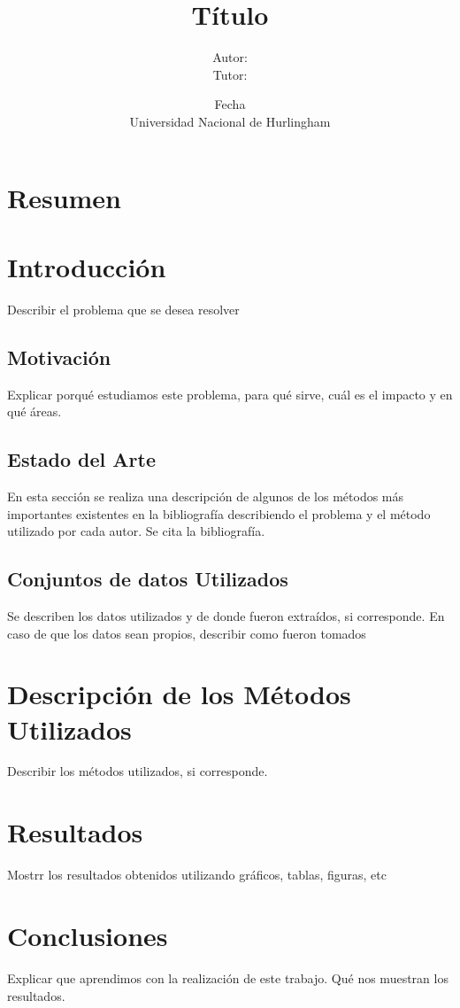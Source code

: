\documentclass[a4paper,10pt]{book}
\title{Título}
\author{Autor: \\ Tutor:}
\date{Fecha \\ Universidad Nacional de Hurlingham}
\begin{document}
\maketitle


\tableofcontents
\listoffigures
\listoftables

\chapter*{Resumen}

\chapter{Introducción}


Describir el problema que se desea resolver

\section{Motivación}

Explicar porqué estudiamos este problema, para qué sirve, cuál es el impacto y en qué áreas.


\section{Estado del Arte}


En esta sección se realiza una descripción de algunos de los métodos más importantes existentes en la bibliografía describiendo el problema y el método utilizado por cada autor. Se cita la bibliografía. 
 
\section{Conjuntos de datos Utilizados}
Se describen los datos utilizados y de donde fueron extraídos, si corresponde. En caso de que los datos sean propios, describir como fueron tomados

\chapter{Descripción de los Métodos Utilizados}

Describir los métodos utilizados, si corresponde. 



\chapter{Resultados}

Mostrr los resultados obtenidos utilizando gráficos, tablas, figuras, etc

\chapter{Conclusiones}

Explicar que aprendimos con la realización de este trabajo. Qué nos muestran los resultados. 



\end{document}

